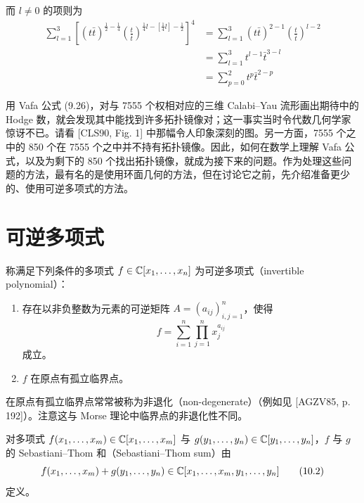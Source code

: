 
而 $l\neq 0$ 的项则为
\begin{align}
    \sum_{l=1}^{3}\left[(t\bar t)^{\frac{1}{2}-\frac{1}{4}}\left(\frac{t}{\bar t}\right)^{\frac{1}{4}l-\left[\frac{1}{4}l\right]-\frac{1}{2}}\right]^{4}
    &= \sum_{l=1}^{3}(t\bar t)^{2-1}\left(\frac{t}{\bar t}\right)^{l-2} \tag{9.39}\\
    &= \sum_{l=1}^{3}t^{l-1}\bar t^{3-l} \tag{9.40}\\
    &= \sum_{p=0}^{2}t^{p}\bar t^{2-p} \tag{9.41}
\end{align}

用 Vafa 公式 (9.26)，对与 7555 个权相对应的三维 Calabi–Yau 流形画出期待中的 Hodge 数，就会发现其中能找到许多拓扑镜像对；这一事实当时令代数几何学家惊讶不已。请看 [CLS90, Fig. 1] 中那幅令人印象深刻的图。另一方面，7555 个之中的 850 个在 7555 个之中并不持有拓扑镜像。因此，如何在数学上理解 Vafa 公式，以及为剩下的 850 个找出拓扑镜像，就成为接下来的问题。作为处理这些问题的方法，最有名的是使用环面几何的方法，但在讨论它之前，先介绍准备更少的、使用可逆多项式的方法。

\section{可逆多项式}

称满足下列条件的多项式 $f\in\mathbb{C}[x_1,\ldots,x_n]$ 为可逆多项式（invertible polynomial）：

\begin{enumerate}
\item 存在以非负整数为元素的可逆矩阵 $A=(a_{ij})_{i,j=1}^{n}$，使得
\begin{equation}
    f=\sum_{i=1}^{n}\prod_{j=1}^{n}x_j^{a_{ij}} \tag{10.1}
\end{equation}
成立。
\item $f$ 在原点有孤立临界点。
\end{enumerate}

在原点有孤立临界点常常被称为非退化（non-degenerate）（例如见 [AGZV85, p. 192]）。注意这与 Morse 理论中临界点的非退化性不同。

对多项式 $f(x_1,\ldots,x_m)\in\mathbb{C}[x_1,\ldots,x_m]$ 与 $g(y_1,\ldots,y_n)\in\mathbb{C}[y_1,\ldots,y_n]$，$f$ 与 $g$ 的 Sebastiani–Thom 和（Sebastiani–Thom sum）由
\begin{equation}
    f(x_1,\ldots,x_m)+g(y_1,\ldots,y_n)\in\mathbb{C}[x_1,\ldots,x_m,y_1,\ldots,y_n] \tag{10.2}
\end{equation}
定义。

